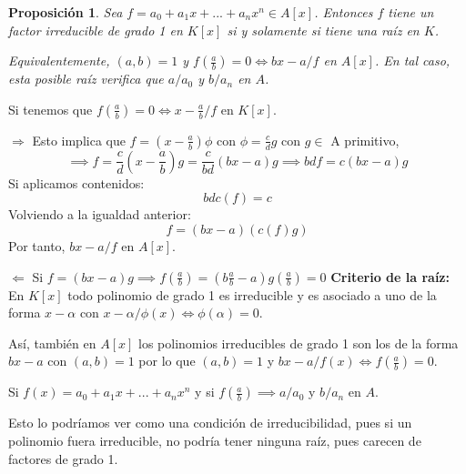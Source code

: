 \documentclass[11pt, a4paper, titlepage]{article}
\makeatletter
\renewenvironment{proof}[1][\proofname] {\vspace{-15pt}\par\pushQED{\qed}\normalfont\topsep6\p@\@plus6\p@\relax\trivlist\item[\hskip\labelsep\it#1\@addpunct{.}]\ignorespaces}{\popQED\endtrivlist\@endpefalse}
\theoremstyle{theorem-style}
\newtheorem*{nprop}{Proposición}
\theoremstyle{definition-style}
\theoremstyle{remark-style}
\theoremstyle{example-style}
\makeatother
\begin{document}
\begin{nprop}
	Sea $f=a_0+a_1x+...+a_nx^n \in A[x]$. Entonces $f$ tiene un factor irreducible de grado 1 en $K[x]$ si y solamente si tiene una raíz en $K$.
	
	Equivalentemente, $(a,b)=1$ y $f(\frac{a}{b})=0 \iff bx-a/f$ en $A[x]$. En tal caso, esta posible raíz verifica que $a/a_0$ y $b/a_n$ en $A$.
\end{nprop}
\begin{proof}
	Si tenemos que $f(\frac{a}{b})=0 \iff x-\frac{a}{b}/f$ en $K[x]$.
	
	$\boxed{\Rightarrow}$ Esto implica que $f=(x-\frac{a}{b})\phi$ con $\phi=\frac{c}{d}g$ con $g \in$ A primitivo, $$\implies f= \frac{c}{d}(x-\frac{a}{b})g = \frac{c}{bd}(bx-a)g \implies bdf=c(bx-a)g$$
	Si aplicamos contenidos:
	\[
	bdc(f)=c
	\]
	Volviendo a la igualdad anterior:
	\[
	f=(bx-a)(c(f)g)
	\]
	Por tanto, $bx-a/f$ en $A[x]$.
	
	$\boxed{\Leftarrow}$ Si $f=(bx-a)g \implies f(\frac{a}{b}) = (b\frac{a}{b}-a)g(\frac{a}{b})=0$
\end{proof}
\textbf{Criterio de la raíz:}
En $K[x]$ todo polinomio de grado 1 es irreducible y es asociado a uno de la forma $x-\alpha$ con $x-\alpha/\phi(x)\iff \phi(\alpha) = 0$.

Así, también en $A[x]$ los polinomios irreducibles de grado 1 son los de la forma $bx-a$ con $(a,b)=1$ por lo que $(a,b)=1$ y $bx-a/f(x)\iff f(\frac{a}{b})= 0$.

Si $f(x)= a_0+a_1x+...+a_nx^n$ y si $f(\frac{a}{b}) \implies a / a_0$ y $b/a_n$ en $A$.

Esto lo podríamos ver como una condición de irreducibilidad, pues si un polinomio fuera irreducible, no podría tener ninguna raíz, pues carecen de factores de grado 1.
\end{document}
